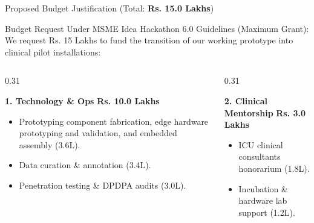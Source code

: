 \documentclass[aspectratio=169, 11pt]{beamer}
\begin{document}
\begin{frame}{Proposed Budget Justification (Total: \textbf{Rs. 15.0 Lakhs})}
    \begin{block}{Budget Request Under MSME Idea Hackathon 6.0 Guidelines (Maximum Grant):}
        \scriptsize
        We request Rs. 15 Lakhs to fund the transition of our working prototype into clinical pilot installations:
    \end{block}
    
    \begin{columns}[t]
        \begin{column}{0.31\textwidth}
            \begin{block}{\textcolor{neonCyan}{\textbf{1. Technology \& Ops}}}
                \centering
                \vspace{0.1cm}
                {\normalsize\textbf{\textcolor{neonCyan}{Rs. 10.0 Lakhs}}} \\
                \vspace{0.2cm}
                \flushleft\tiny
                \begin{itemize}
                    \item Prototyping component fabrication, edge hardware prototyping and validation, and embedded assembly (3.6L).
                    \item Data curation \& annotation (3.4L).
                    \item Penetration testing \& DPDPA audits (3.0L).
                \end{itemize}
            \end{block}
        \end{column}
        
        \begin{column}{0.31\textwidth}
            \begin{block}{\textcolor{neonTeal}{\textbf{2. Clinical Mentorship}}}
                \centering
                \vspace{0.1cm}
                {\normalsize\textbf{\textcolor{neonTeal}{Rs. 3.0 Lakhs}}} \\
                \vspace{0.2cm}
                \flushleft\tiny
                \begin{itemize}
                    \item ICU clinical consultants honorarium (1.8L).
                    \item Incubation \& hardware lab support (1.2L).
                \end{itemize}
            \end{block}
        \end{column}
        

\end{columns}
\end{frame}
\end{document}
